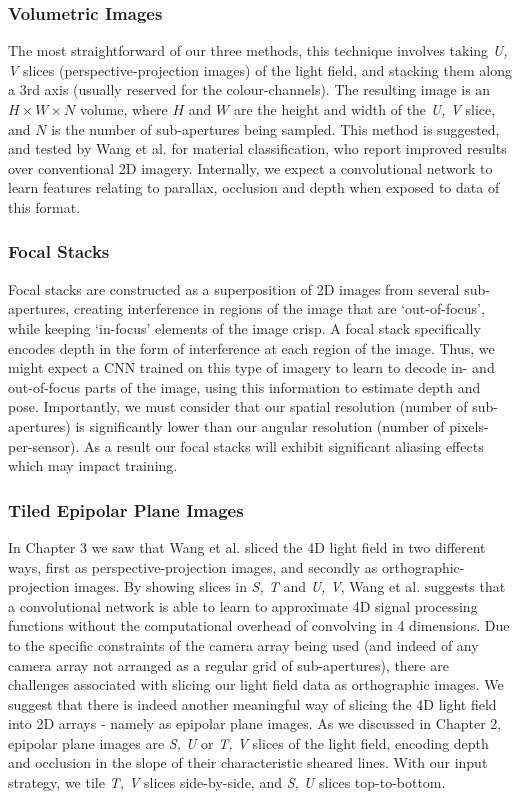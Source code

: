 \subsubsection{Volumetric Images}
The most straightforward of our three methods, this technique involves taking \textit{U, V} slices (perspective-projection images) of the light field, and stacking them along a 3rd axis (usually reserved for the colour-channels). The resulting image is an $H \times W \times N$ volume, where $H$ and $W$ are the height and width of the \textit{U, V} slice, and $N$ is the number of sub-apertures being sampled. This method is suggested, and tested by Wang et al. \cite{wang2016lfcnn} for material classification, who report improved results over conventional 2D imagery. Internally, we expect a convolutional network to learn features relating to parallax, occlusion and depth when exposed to data of this format.

\subsubsection{Focal Stacks}
Focal stacks are constructed as a superposition of 2D images from several sub-apertures, creating interference in regions of the image that are `out-of-focus', while keeping `in-focus' elements of the image crisp. A focal stack specifically encodes depth in the form of interference at each region of the image. Thus, we might expect a CNN trained on this type of imagery to learn to decode in- and out-of-focus parts of the image, using this information to estimate depth and pose. Importantly, we must consider that our spatial resolution (number of sub-apertures) is significantly lower than our angular resolution (number of pixels-per-sensor). As a result our focal stacks will exhibit significant aliasing effects which may impact training.


\subsubsection{Tiled Epipolar Plane Images}
In Chapter 3 we saw that Wang et al. \cite{wang2016lfcnn} sliced the 4D light field in two different ways, first as perspective-projection images, and secondly as orthographic-projection images. By showing slices in \textit{S, T} and \textit{U, V}, Wang et al. suggests that a convolutional network is able to learn to approximate 4D signal processing functions without the computational overhead of convolving in 4 dimensions. Due to the specific constraints of the camera array being used (and indeed of any camera array not arranged as a regular grid of sub-apertures), there are challenges associated with slicing our light field data as orthographic images. We suggest that there is indeed another meaningful way of slicing the 4D light field into 2D arrays - namely as epipolar plane images. As we discussed in Chapter 2, epipolar plane images are \textit{S, U} or \textit{T, V} slices of the light field, encoding depth and occlusion in the slope of their characteristic sheared lines. With our input strategy, we tile \textit{T, V} slices side-by-side, and \textit{S, U} slices top-to-bottom. 

